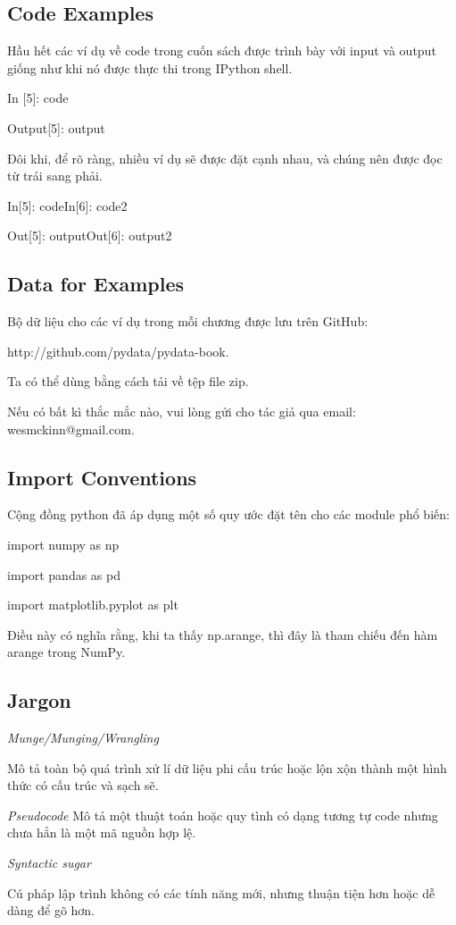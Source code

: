 \subsection{Code Examples}\par
\quad Hầu hết các ví dụ về code trong cuốn sách được trình bày với input và output giống như khi nó được thực thi trong IPython shell.\par
In [5]: code\par
Output[5]: output\par
Đôi khi, để rõ ràng, nhiều ví dụ sẽ được đặt cạnh nhau, và chúng nên được đọc từ trái sang phải.\par
In[5]: code\quad \quad In[6]: code2\par
Out[5]: output\quad Out[6]: output2\par
\subsection{Data for Examples}
\quad Bộ dữ liệu cho các ví dụ trong mỗi chương được lưu trên GitHub:\par http://github.com/pydata/pydata-book. \par
Ta có thể dùng  bằng cách tải về tệp file zip.\par
Nếu có bất kì thắc mắc nào, vui lòng gửi cho tác giả qua email: wesmckinn@gmail.com.

\subsection{Import Conventions}
\quad Cộng đồng python đã áp dụng một số quy ước đặt tên cho các module phổ biến:\par
import numpy as np\par
import pandas as pd\par
import matplotlib.pyplot as plt\par
Điều này có nghĩa rằng, khi ta thấy np.arange, thì đây là tham chiếu đến hàm arange trong NumPy.
\subsection{Jargon}\par

\quad \quad \textit{Munge/Munging/Wrangling}\par
Mô tả toàn bộ quá trình xử lí dữ liệu phi cấu trúc hoặc lộn xộn thành một hình thức có cấu trúc và sạch sẽ.

\textit{Pseudocode}
Mô tả một thuật toán hoặc quy tình có dạng tương tự code nhưng chưa hẳn là một mã nguồn hợp lệ.

\textit{Syntactic sugar}\par
Cú pháp lập trình không có các tính năng mới, nhưng thuận tiện hơn hoặc dễ dàng để gõ hơn.
